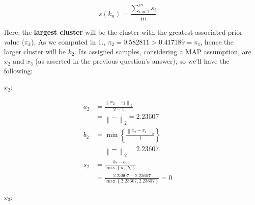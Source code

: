 \documentclass[12pt]{article}
\begin{document}
\begin{enumerate}[leftmargin=\labelsep]
\begin{enumerate}[leftmargin=\labelsep]
                \begin{equation*}
                  s(k_n) = \frac{\sum_{i=1}^m s_i}{m}
                \end{equation*}

                Here, the \textbf{largest cluster} will be the cluster with the
                greatest associated prior value ($\pi_k$). As we computed in 1.,
                $\pi_2 = 0.582811 > 0.417189 = \pi_1$,
                hence the larger cluster will be $k_2$. Its assigned samples,
                considering a MAP assumption, are $x_2$ and $x_3$ (as asserted
                in the previous question's answer), so we'll have the following:

                \vspace*{0.5cm}

                \begin{paracol}{2}
                  \setlength{\columnseprule}{1pt}
                  \def\columnseprulecolor{\color{black}}
                  \centering

                  $x_2$:

                  \begin{equation*}
                    \begin{aligned}
                      a_2 & = \frac{\left\| x_2 - x_3 \right\|_2}{2 - 1}                             \\
                          & = \left\|  -  \right\|_2
                      = 2.23607                                                                      \\
                      b_2 & = \min\left\{\frac{\left\| x_2 - x_1 \right\|_2}{1}\right\}              \\
                          & = \left\|  -  \right\|_2
                      = 2.23607                                                                      \\
                      s_2 & = \frac{b_2 - a_2}{\max\left\{a_2, b_2\right\}}                          \\
                          & = \frac{2.23607 - 2.23607}{\max\left\{2.23607, 2.23607\right\}} = 0
                    \end{aligned}
                  \end{equation*}

                  \switchcolumn

                  $x_3$:


\end{paracol}
\end{enumerate}
\end{enumerate}
\end{document}
